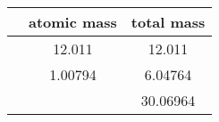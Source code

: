 \documentclass{article}
\begin{document}
  \begin{tabular}{lSS}
    \toprule
              & {atomic mass} & {total mass} \\
    \midrule
        &    12.011     & 12.011       \\
        &     1.00794   &  6.04764     \\
     &               & 30.06964     \\
    \bottomrule
  \end{tabular}
\end{document}
